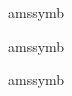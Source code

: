 \documentclass[a4paper,10pt]{article}
\begin{document}
\begin{neededpkgs}{amssymb}
\mathcommand{\nsubseteq}
\mathcommand{\subseteqq}
\mathcommand{\supsetneqq}
\mathcommand{\nsupseteq}
\mathcommand{\subsetneq}
\mathcommand{\varsubsetneq}
\mathcommand{\nsupseteqq}
\mathcommand{\subsetneqq}
\mathcommand{\varsubsetneqq}
\mathcommand{\sqsubset}
\mathcommand{\Supset}
\mathcommand{\varsupsetneq}
\mathcommand{\sqsupset}
\mathcommand{\supseteqq}
\mathcommand{\varsupsetneqq}
\mathcommand{\Subset}
\mathcommand{\supsetneq}
\end{neededpkgs}
\par
\mathcommand{\geq}
\mathcommand{\gg}
\mathcommand{\leq}
\mathcommand{\ll}
\mathcommand{\neq}
\par
\begin{neededpkgs}{amssymb}
\mathcommand{\eqslantgtr}
\mathcommand{\gtrdot}
\mathcommand{\lesseqgtr}
\mathcommand{\ngeq}
\mathcommand{\eqslantless}
\mathcommand{\gtreqless}
\mathcommand{\lesseqqgtr}
\mathcommand{\ngeqq}
\mathcommand{\geqq}
\mathcommand{\gtreqqless}
\mathcommand{\lessgtr}
\mathcommand{\ngeqslant}
\mathcommand{\geqslant}
\mathcommand{\gtrless}
\mathcommand{\lesssim}
\mathcommand{\ngtr}
\mathcommand{\ggg}
\mathcommand{\gtrsim}
\mathcommand{\lll}
\mathcommand{\nleq}
\mathcommand{\gnapprox}
\mathcommand{\gvertneqq}
\mathcommand{\lnapprox}
\mathcommand{\nleqq}
\mathcommand{\gneq}
\mathcommand{\leqq}
\mathcommand{\lneq}
\mathcommand{\nleqslant}
\mathcommand{\gneqq}
\mathcommand{\leqslant}
\mathcommand{\lneqq}
\mathcommand{\nless}
\mathcommand{\gnsim}
\mathcommand{\lessapprox}
\mathcommand{\lnsim}
\mathcommand{\gtrapprox}
\mathcommand{\lessdot}
\mathcommand{\lvertneqq}
\end{neededpkgs}

\begin{neededpkgs}{amssymb}
\mathcommand{\blacktriangleleft}
\mathcommand{\ntrianglelefteq}
\mathcommand{\trianglelefteq}
\mathcommand{\vartriangleleft}
\mathcommand{\blacktriangleright}
\mathcommand{\ntriangleright}
\mathcommand{\triangleq}
\mathcommand{\vartriangleright}
\mathcommand{\ntriangleleft}
\mathcommand{\ntrianglerighteq}
\mathcommand{\trianglerighteq}
\end{neededpkgs}
\end{document}
